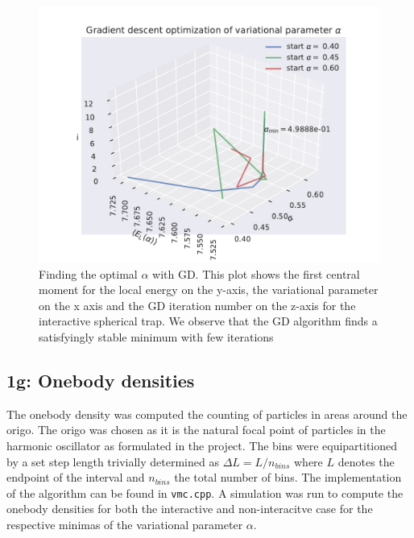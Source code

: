 \begin{figure}
\includegraphics{figures/GD_NM_IA.pdf}
\caption{Finding the optimal $\alpha$ with GD. This plot shows the first central moment for the local energy on the y-axis, the variational parameter on the x axis and the GD iteration number on the z-axis for the interactive spherical trap. We observe that the GD algorithm finds a satisfyingly stable minimum with few iterations}\label{fig:gd_nm_ia}
\end{figure} 

\subsection*{\textbf{1g:} Onebody densities}

The onebody density was computed the counting of particles in areas around the origo. The origo was chosen as it is the natural focal point of particles in the harmonic oscillator as formulated in the project. The bins were equipartitioned by a set step length trivially determined as $\Delta L = L/n_{bins}$ where $L$ denotes the endpoint of the interval and $n_{bins}$ the total number of bins. The implementation of the algorithm can be found in \lstinline{vmc.cpp}. A simulation was run to compute the onebody densities for both the interactive and non-interacitve case for the respective minimas of the variational parameter $\alpha$. 
